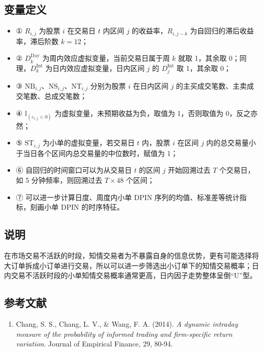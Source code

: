 \documentclass{article}
\begin{document}
\subsection{变量定义}
\begin{itemize}
    \item ① \( R_{i,j} \) 为股票 \( i \) 在交易日 \( t \) 内区间 \( j \) 的收益率，\( R_{i,j-k} \) 为自回归的滞后收益率，滞后阶数 \( k=12 \)；
    \item ② \( D_k^{\mathrm{Day}} \) 为周内效应虚拟变量，当前交易日属于周 \( k \) 就取 1，其余取 0；同理，\( D_k^{\mathrm{Int}} \) 为日内效应虚拟变量，日内区间 \( j \) 的 \( D_j^{\mathrm{Int}} \) 取 1，其余取 0；
    \item ③ \( \mathrm{NB}_{i,j} \)、\( \mathrm{NS}_{i,j} \)、\( \mathrm{NT}_{i,j} \) 分别为股票 \( i \) 在日内区间 \( j \) 的主买成交笔数、主卖成交笔数、总成交笔数；
    \item ④ \( \mathbb{I}_{(\varepsilon_{i,j} < 0)} \) 为虚拟变量，未预期收益为负，取值为 1，否则取值为 0，反之亦然；
    \item ⑤ \( \mathrm{ST}_{i,j} \) 为小单的虚拟变量，若交易日 \( t \) 内，股票 \( i \) 在区间 \( j \) 内的总交易量小于当日各个区间内总交易量的中位数时，赋值为 1；
    \item ⑥ 自回归的时间窗口可以为从交易日 \( t \) 的区间 \( j \) 开始回溯过去 \( T \) 个交易日，如 5 分钟频率，则回溯过去 \( T \times 48 \) 个区间；
    \item ⑦ 可以进一步计算日度、周度内小单 DPIN 序列的均值、标准差等统计指标，刻画小单 DPIN 的时序特征。
\end{itemize}

\subsection{说明}
在市场交易不活跃的时段，知情交易者为不暴露自身的信息优势，更有可能选择将大订单拆成小订单进行交易，所以可以进一步筛选出小订单下的知情交易概率；日内交易不活跃时段的小单知情交易概率通常更高，日内因子走势整体呈倒“U”型。

\subsection{参考文献}
\begin{enumerate}
    \item Chang, S. S., Chang, L. V., \& Wang, F. A. (2014). \textit{A dynamic intraday measure of the probability of informed trading and firm-specific return variation}. Journal of Empirical Finance, 29, 80-94.
\end{enumerate}
\end{document}
